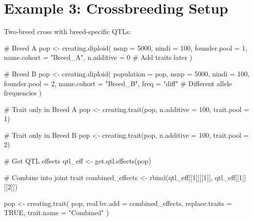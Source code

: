 \documentclass[
  letterpaper,
]{book}
\newenvironment{Shaded}{\begin{snugshade}}{\end{snugshade}}
\newcommand{\AttributeTok}[1]{\textcolor[rgb]{0.40,0.45,0.13}{#1}}
\newcommand{\CommentTok}[1]{\textcolor[rgb]{0.37,0.37,0.37}{#1}}
\newcommand{\ConstantTok}[1]{\textcolor[rgb]{0.56,0.35,0.01}{#1}}
\newcommand{\DecValTok}[1]{\textcolor[rgb]{0.68,0.00,0.00}{#1}}
\newcommand{\FunctionTok}[1]{\textcolor[rgb]{0.28,0.35,0.67}{#1}}
\newcommand{\NormalTok}[1]{\textcolor[rgb]{0.00,0.23,0.31}{#1}}
\newcommand{\OtherTok}[1]{\textcolor[rgb]{0.00,0.23,0.31}{#1}}
\newcommand{\StringTok}[1]{\textcolor[rgb]{0.13,0.47,0.30}{#1}}
\begin{document}
\section{Example 3: Crossbreeding
Setup}\label{sec-example-crossbreeding}

Two-breed cross with breed-specific QTLs:

\begin{Shaded}
\begin{Highlighting}[]
\CommentTok{\# Breed A}
\NormalTok{pop }\OtherTok{\textless{}{-}} \FunctionTok{creating.diploid}\NormalTok{(}
  \AttributeTok{nsnp =} \DecValTok{5000}\NormalTok{, }\AttributeTok{nindi =} \DecValTok{100}\NormalTok{,}
  \AttributeTok{founder.pool =} \DecValTok{1}\NormalTok{,}
  \AttributeTok{name.cohort =} \StringTok{"Breed\_A"}\NormalTok{,}
  \AttributeTok{n.additive =} \DecValTok{0}  \CommentTok{\# Add traits later}
\NormalTok{)}

\CommentTok{\# Breed B}
\NormalTok{pop }\OtherTok{\textless{}{-}} \FunctionTok{creating.diploid}\NormalTok{(}
  \AttributeTok{population =}\NormalTok{ pop,}
  \AttributeTok{nsnp =} \DecValTok{5000}\NormalTok{, }\AttributeTok{nindi =} \DecValTok{100}\NormalTok{,}
  \AttributeTok{founder.pool =} \DecValTok{2}\NormalTok{,}
  \AttributeTok{name.cohort =} \StringTok{"Breed\_B"}\NormalTok{,}
  \AttributeTok{freq =} \StringTok{"diff"}  \CommentTok{\# Different allele frequencies}
\NormalTok{)}

\CommentTok{\# Trait only in Breed A}
\NormalTok{pop }\OtherTok{\textless{}{-}} \FunctionTok{creating.trait}\NormalTok{(pop, }\AttributeTok{n.additive =} \DecValTok{100}\NormalTok{, }\AttributeTok{trait.pool =} \DecValTok{1}\NormalTok{)}

\CommentTok{\# Trait only in Breed B}
\NormalTok{pop }\OtherTok{\textless{}{-}} \FunctionTok{creating.trait}\NormalTok{(pop, }\AttributeTok{n.additive =} \DecValTok{100}\NormalTok{, }\AttributeTok{trait.pool =} \DecValTok{2}\NormalTok{)}

\CommentTok{\# Get QTL effects}
\NormalTok{qtl\_eff }\OtherTok{\textless{}{-}} \FunctionTok{get.qtl.effects}\NormalTok{(pop)}

\CommentTok{\# Combine into joint trait}
\NormalTok{combined\_effects }\OtherTok{\textless{}{-}} \FunctionTok{rbind}\NormalTok{(qtl\_eff[[}\DecValTok{1}\NormalTok{]][[}\DecValTok{1}\NormalTok{]], qtl\_eff[[}\DecValTok{1}\NormalTok{]][[}\DecValTok{2}\NormalTok{]])}

\NormalTok{pop }\OtherTok{\textless{}{-}} \FunctionTok{creating.trait}\NormalTok{(}
\NormalTok{  pop,}
  \AttributeTok{real.bv.add =}\NormalTok{ combined\_effects,}
  \AttributeTok{replace.traits =} \ConstantTok{TRUE}\NormalTok{,}
  \AttributeTok{trait.name =} \StringTok{"Combined"}
\NormalTok{)}


\end{Highlighting}
\end{Shaded}
\end{document}
